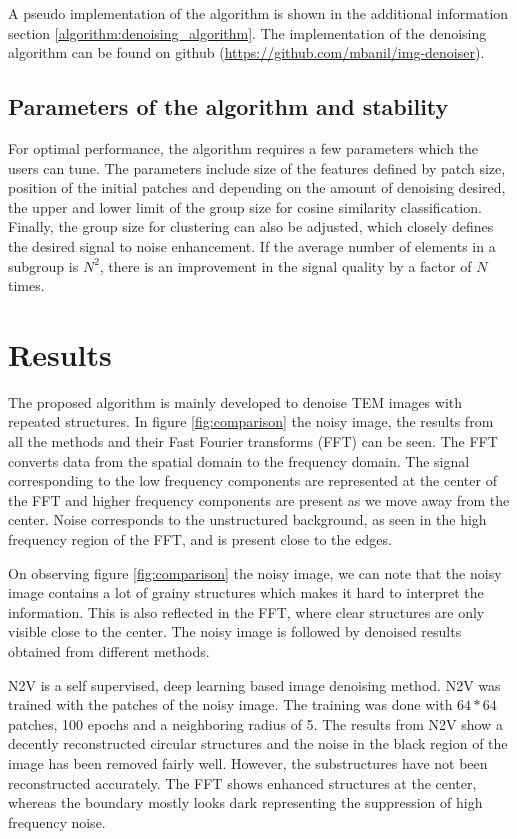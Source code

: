 \documentclass[fleqn,10pt]{wlscirep}
\begin{document}
	A pseudo implementation of the algorithm is shown in the additional information section \ref{algorithm:denoising_algorithm}. The implementation of the denoising algorithm can be found on github (\url{https://github.com/mbanil/img-denoiser}).
	
	\subsection*{Parameters of the algorithm and stability}
	
	For optimal performance, the algorithm requires a few parameters which the users can tune. The parameters include size of the features defined by patch size, position of the initial patches and depending on the amount of denoising desired, the upper and lower limit of the group size for cosine similarity classification. Finally, the group size for clustering can also be adjusted, which closely defines the desired signal to noise enhancement. If the average number of elements in a subgroup is $N^2$, there is an improvement in the signal quality by a factor of $N$ times\cite{bcm_nlm}.
	
	\section*{Results}
	
	The proposed algorithm is mainly developed to denoise TEM images with repeated structures. In figure \ref{fig:comparison} the noisy image, the results from all the methods and their Fast Fourier transforms (FFT) can be seen. The FFT converts data from the spatial domain to the frequency domain. The signal corresponding to the low frequency components are represented at the center of the FFT and higher frequency components are present as we move away from the center. Noise corresponds to the unstructured background, as seen in the high frequency region of the FFT, and is present close to the edges.
	
	On observing figure \ref{fig:comparison} the noisy image, we can note that the noisy image contains a lot of grainy structures which makes it hard to interpret the information. This is also reflected in the FFT, where clear structures are only visible close to the center. The noisy image is followed by denoised results obtained from different methods. 
	
	N2V\cite{krull2019noise2void} is a self supervised, deep learning based image denoising method. N2V was trained with the patches of the noisy image. The training was done with $64*64$ patches, 100 epochs and a neighboring radius of 5. The results from N2V show a decently reconstructed circular structures and the noise in the black region of the image has been removed fairly well. However, the substructures have not been reconstructed accurately. The FFT shows enhanced structures at the center, whereas the boundary mostly looks dark representing the suppression of high frequency noise. 
		
\end{document}
